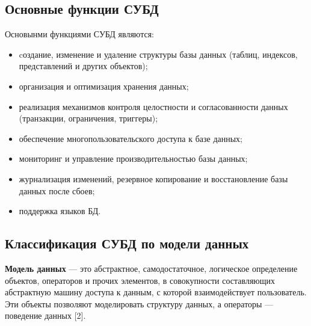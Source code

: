 \subsection{Основные функции СУБД}
Основынми функциями СУБД являются:
\begin{itemize}
	\item cоздание, изменение и удаление структуры базы данных (таблиц, индексов, представлений и других объектов);
	\item организация и оптимизация хранения данных;
	\item реализация механизмов контроля целостности и согласованности данных (транзакции, ограничения, триггеры);
	\item обеспечение многопользовательского доступа к базе данных;
	\item мониторинг и управление производительностью базы данных;
	\item журнализация изменений, резервное копирование и восстановление базы данных после сбоев;
	\item поддержка языков БД.
\end{itemize}

\subsection{Классификация СУБД по модели данных}
\textbf{Модель данных} --- это абстрактное, самодостаточное, логическое определение объектов, операторов и прочих элементов, в совокупности составляющих абстрактную машину доступа к данным, с которой взаимодействует пользователь. Эти объекты позволяют моделировать структуру данных, а операторы --- поведение данных [2]. 

